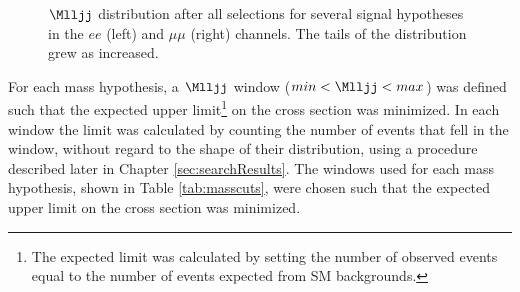 \begin{figure}[btp]
	\centering
	\label{fig:signalShapesAfterSelection}
	\caption{$\Mlljj$ distribution after all selections for several \WR signal hypotheses in the $ee$ (left) and $\mu\mu$ (right) 
		channels.  The tails of the distribution grew as \mWR increased.}
\end{figure}


For each \mWR mass hypothesis, a $\Mlljj$ window ($ min < \Mlljj < max$) was defined such 
that the expected upper limit\footnote{The expected limit was calculated by setting the 
number of observed events equal to the number of events expected from SM backgrounds.} on 
the \WR cross section was minimized.  In each window the limit was calculated by counting 
the number of events that fell in the window, without regard to the shape of their distribution, 
using a procedure described later in Chapter \ref{sec:searchResults}.  The windows used 
for each \mWR mass hypothesis, shown in Table \ref{tab:masscuts}, were chosen such that the expected upper 
limit on the \WR cross section was minimized.

